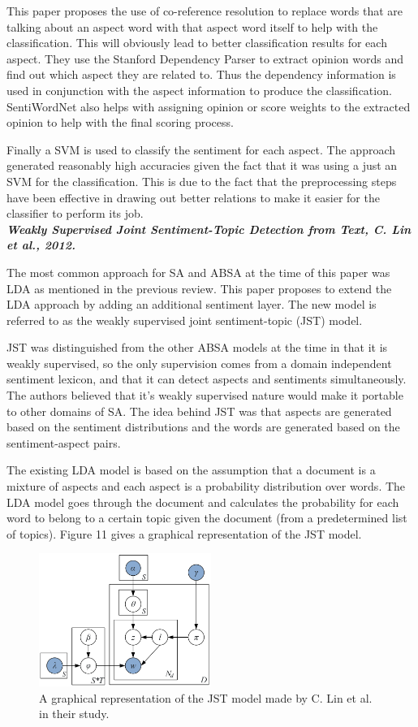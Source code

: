 \documentclass[conference]{IEEEtran}
\begin{document}
This paper proposes the use of co-reference resolution to replace words that are talking about an aspect word with that aspect word itself to help with the classification. This will obviously lead to better classification results for each aspect. They use the Stanford Dependency Parser to extract opinion words and find out which aspect they are related to. Thus the dependency information is used in conjunction with the aspect information to produce the classification. SentiWordNet also helps with assigning opinion or score weights to the extracted opinion to help with the final scoring process.

Finally a SVM is used to classify the sentiment for each aspect. The approach generated reasonably high accuracies given the fact that it was using a just an SVM for the classification. This is due to the fact that the preprocessing steps have been effective in drawing out better relations to make it easier for the classifier to perform its job.\\

\textit{\textbf{Weakly Supervised Joint Sentiment-Topic Detection from Text, C. Lin et al., 2012.}}

The most common approach for SA and ABSA at the time of this paper was LDA as mentioned in the previous review. This paper proposes to extend the LDA approach by adding an additional sentiment layer. The new model is referred to as the weakly supervised joint sentiment-topic (JST) model.

JST was distinguished from the other ABSA models at the time in that it is weakly supervised, so the only supervision comes from a domain independent sentiment lexicon, and that it can detect aspects and sentiments simultaneously. The authors believed that it's weakly supervised nature would make it portable to other domains of SA. The idea behind JST was that aspects are generated based on the sentiment distributions and the words are generated based on the sentiment-aspect pairs.

The existing LDA model is based on the assumption that a document is a mixture of aspects and each aspect is a probability distribution over words. The LDA model goes through the document and calculates the probability for each word to belong to a certain topic given the document (from a predetermined list of topics). Figure 11 gives a graphical representation of the JST model.

\begin{figure}[htbp]
\centerline{\includegraphics[keepaspectratio, width=0.5\textwidth]{pics/11.png}}
\caption{A graphical representation of the JST model made by C. Lin et al. in their study.}
\label{fig}
\end{figure}
\end{document}
